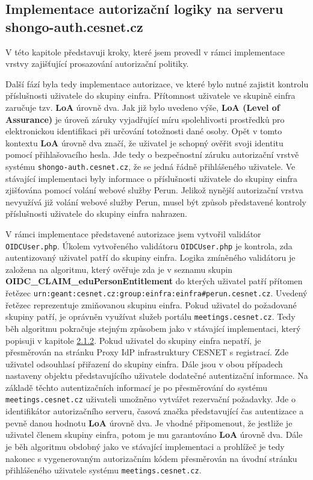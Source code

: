 \documentclass[
  printed, %
  twoside, %
  table,   %
  nolof,     %
  nolot,     %
]{fithesis3}
\begin{document}
\subsection{Implementace autorizační logiky na serveru shongo-auth.cesnet.cz}
\label{ShongoImpl-authr}    
V této kapitole představuji kroky, které jsem provedl v rámci implementace vrstvy zajišťující prosazování autorizační politiky. \par 
Další fází byla tedy implementace autorizace, ve které bylo nutné zajistit kontrolu příslušnosti uživatele do skupiny einfra. Přítomnost uživatele ve skupině einfra zaručuje tzv. \textbf{LoA} úrovně dva. Jak již bylo uvedeno výše, \textbf{LoA (Level of Assurance)} je úroveň záruky vyjadřující míru spolehlivosti prostředků pro elektronickou identifikaci při určování totožnosti dané osoby. Opět v tomto kontextu \textbf{LoA} úrovně dva značí, že uživatel je schopný ověřit svoji identitu pomocí přihlašovacího hesla. Jde tedy o bezpečnostní záruku autorizační vrstvě systému \texttt{shongo-auth.cesnet.cz}, že se jedná řádně přihlášeného uživatele. Ve stávající implementaci byly informace o příslušnosti uživatele do skupiny einfra zjišťována pomocí volání webové služby Perun. Jelikož nynější autorizační vrstva nevyužívá již volání webové služby Perun, musel být způsob představené kontroly příslušnosti uživatele do skupiny einfra nahrazen. 

\par

V rámci implementace představené autorizace jsem vytvořil validátor \texttt{OIDCUser.php}. Úkolem vytvořeného validátoru \texttt{OIDCUser.php} je kontrola, zda autentizovaný uživatel patří do skupiny einfra. Logika zmíněného validátoru je založena na algoritmu, který ověřuje zda je v seznamu skupin \textbf{OIDC\_CLAIM\_eduPersonEntitlement} do kterých uživatel patří přítomen řetězec \texttt{urn:geant:cesnet.cz:group:einfra:einfra\#perun.cesnet.cz}. Uvedený řetězec reprezentuje zmiňovanou skupinu einfra. Pokud uživatel do požadované skupiny patří, je oprávněn využívat služeb portálu \texttt{meetings.cesnet.cz}. Tedy běh algoritmu pokračuje stejným způsobem jako v stávající implementaci, který popisuji v kapitole \hyperref[meetings-old]{2.1.2}. Pokud uživatel do skupiny einfra nepatří, je přesměrován na stránku Proxy IdP infrastruktury CESNET s registrací. Zde uživatel odsouhlasí přiřazení do skupiny einfra. Dále jsou v obou případech nastaveny objektu představujícího uživatele dodatečné autentizační informace. Na základě těchto autentizačních informací je po přesměrování do systému \texttt{meetings.cesnet.cz} uživateli umožněno vytvářet rezervační požadavky. Jde o identifikátor autorizačního serveru, časová značka představující čas autentizace a pevně danou hodnotu \textbf{LoA} úrovně dva. Je vhodné připomenout, že jestliže je uživatel členem skupiny einfra, potom je mu garantováno \textbf{LoA} úrovně dva. Dále je běh algoritmu obdobný jako ve stávající implementaci a prohlížeč je tedy nakonec s vygenerovaným autorizačním kódem přesměrován na úvodní stránku přihlášeného uživatele systému \texttt{meetings.cesnet.cz}.
\end{document}
